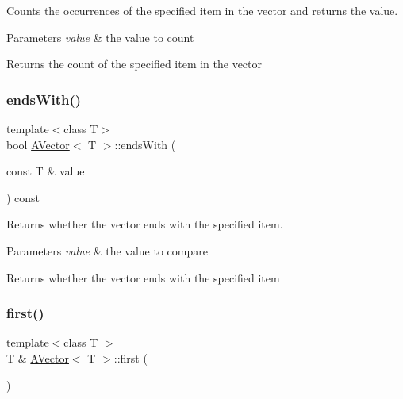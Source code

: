 Counts the occurrences of the specified item in the vector and returns the value. 


\begin{DoxyParams}{Parameters}
{\em value} & the value to count \\
\hline
\end{DoxyParams}
\begin{DoxyReturn}{Returns}
the count of the specified item in the vector 
\end{DoxyReturn}
\mbox{\label{class_a_vector_a9cae5f201ad8fb74850f1d1dc2d044cc}} 
\subsubsection{\texorpdfstring{endsWith()}{endsWith()}}
{\footnotesize\ttfamily template$<$class T$>$ \\
bool \mbox{\hyperlink{class_a_vector}{A\+Vector}}$<$ T $>$\+::ends\+With (\begin{DoxyParamCaption}\item[{const T \&}]{value }\end{DoxyParamCaption}) const}



Returns whether the vector ends with the specified item. 


\begin{DoxyParams}{Parameters}
{\em value} & the value to compare \\
\hline
\end{DoxyParams}
\begin{DoxyReturn}{Returns}
whether the vector ends with the specified item 
\end{DoxyReturn}
\mbox{\label{class_a_vector_a9ad79c8f2af06e68a9eb022cae0bb966}} 
\subsubsection{\texorpdfstring{first()}{first()}\hspace{0.1cm}{\footnotesize\ttfamily [1/2]}}
{\footnotesize\ttfamily template$<$class T $>$ \\
T \& \mbox{\hyperlink{class_a_vector}{A\+Vector}}$<$ T $>$\+::first (\begin{DoxyParamCaption}{ }\end{DoxyParamCaption})}



